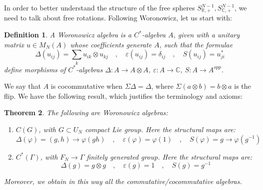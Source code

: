 \documentclass[12pt]{amsbook}
\newtheorem{theorem}{Theorem}[chapter]
\newtheorem{definition}[theorem]{Definition}
\begin{document}
In order to better understand the structure of the free spheres $S^{N-1}_{\mathbb R,+},S^{N-1}_{\mathbb C,+}$, we need to talk about free rotations. Following Woronowicz, let us start with:

\begin{definition}
A Woronowicz algebra is a $C^*$-algebra $A$, given with a unitary matrix $u\in M_N(A)$ whose coefficients generate $A$, such that the formulae
$$\Delta(u_{ij})=\sum_ku_{ik}\otimes u_{kj}\quad,\quad
\varepsilon(u_{ij})=\delta_{ij}\quad,\quad
S(u_{ij})=u_{ji}^*$$
define morphisms of $C^*$-algebras $\Delta:A\to A\otimes A$, $\varepsilon:A\to\mathbb C$, $S:A\to A^{opp}$.
\end{definition}

We say that $A$ is cocommutative when $\Sigma\Delta=\Delta$, where $\Sigma(a\otimes b)=b\otimes a$ is the flip. We have the following result, which justifies the terminology and axioms:

\begin{theorem}
The following are Woronowicz algebras:
\begin{enumerate}
\item $C(G)$, with $G\subset U_N$ compact Lie group. Here the structural maps are:
$$\Delta(\varphi)=(g,h)\to \varphi(gh)\quad,\quad 
\varepsilon(\varphi)=\varphi(1)\quad,\quad 
S(\varphi)=g\to\varphi(g^{-1})$$

\item $C^*(\Gamma)$, with $F_N\to\Gamma$ finitely generated group. Here the structural maps are:
$$\Delta(g)=g\otimes g\quad,\quad 
\varepsilon(g)=1\quad,\quad
S(g)=g^{-1}$$
\end{enumerate}
Moreover, we obtain in this way all the commutative/cocommutative algebras.
\end{theorem}
\end{document}
